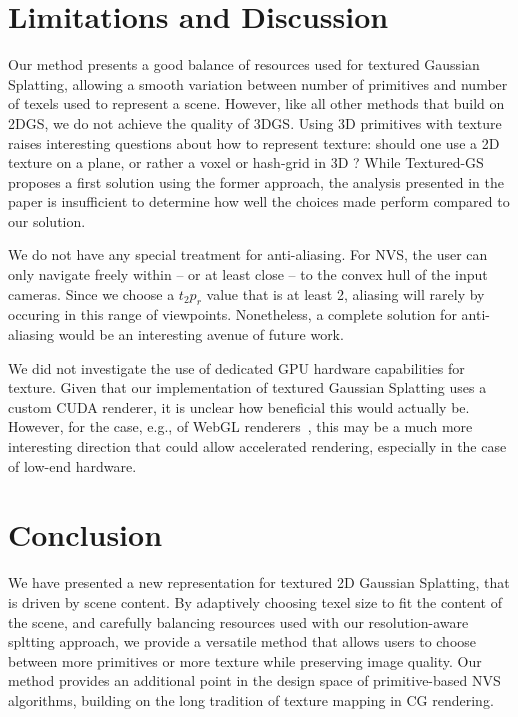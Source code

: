 \section{Limitations and Discussion}

Our method presents a good balance of resources used for textured Gaussian Splatting, allowing a smooth variation between number of primitives and number of texels used to represent a scene. However, like all other methods that build on 2DGS, we do not achieve the quality of 3DGS. Using 3D primitives with texture raises interesting questions about how to represent texture: should one use a 2D texture on a plane, or rather a voxel or hash-grid in 3D ? While Textured-GS~\cite{textured3dgs} proposes a first solution using the former approach, the analysis presented in the paper is insufficient to determine how well the choices made perform compared to our solution.

We do not have any special treatment for anti-aliasing. For NVS, the user can only navigate freely within -- or at least close -- to the convex hull of the input cameras. Since we choose a $t_2p_r$ value that is at least 2, aliasing will rarely by occuring in this range of viewpoints. Nonetheless, a complete solution for anti-aliasing would be an interesting avenue of future work.

We did not investigate the use of dedicated GPU hardware capabilities for texture. Given that our implementation of textured Gaussian Splatting uses a custom CUDA renderer, it is unclear how beneficial this would actually be. However, for the case, e.g., of WebGL renderers~\cite{webglviewer}, this may be a much more interesting direction that could allow accelerated rendering, especially in the case of low-end hardware. 

\section{Conclusion}

We have presented a new representation for textured 2D Gaussian Splatting, that is driven by scene content. By adaptively choosing texel size to fit the content of the scene, and carefully balancing resources used with our resolution-aware spltting approach, we provide a versatile method that allows users to choose between more primitives or more texture while preserving image quality. Our method provides an additional point in the design space of primitive-based NVS algorithms, building on the long tradition of texture mapping in CG rendering.

